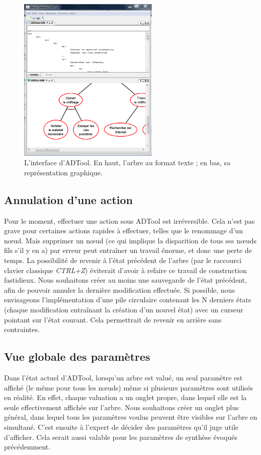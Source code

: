 		\begin{figure}[h]
			\centering
			\includegraphics[width=0.6\textwidth]{figure/interface_adtool.png}
			\caption{L'interface d'ADTool. En haut, l'arbre au format texte ; en bas, sa représentation graphique.}
			\label{fig:int_adTool}
		\end{figure}
	
	\subsection{Annulation d'une action}	
		Pour le moment, effectuer une action sous ADTool est irréversible. Cela n'est pas grave pour certaines actions rapides à effectuer, telles que le renommage d'un nœud. Mais supprimer un nœud (ce qui implique la disparition de tous ses nœuds fils s'il y en a) par erreur peut entraîner un travail énorme, et donc une perte de temps. La possibilité de revenir à l'état précédent de l'arbre (par le raccourci clavier classique \emph{CTRL+Z}) éviterait d'avoir à refaire ce travail de construction fastidieux. Nous souhaitons créer au moins une sauvegarde de l'état précédent, afin de pouvoir annuler la dernière modification effectuée. Si possible, nous envisageons l'implémentation d'une pile circulaire contenant les N derniers états (chaque modification entraînant la création d'un nouvel état) avec un curseur pointant sur l'état courant. Cela permettrait de revenir en arrière sans contraintes. %

	\subsection{Vue globale des paramètres}
		Dans l'état actuel d'ADTool, lorsqu'un arbre est valué, un seul paramètre est affiché (le même pour tous les nœuds) même si plusieurs paramètres sont utilisés en réalité. En effet, chaque valuation a un onglet propre, dans lequel elle est la seule effectivement affichée sur l'arbre. Nous souhaitons créer un onglet plus général, dans lequel tous les paramètres voulus peuvent être visibles sur l'arbre en simultané. C'est ensuite à l'expert de décider des paramètres qu'il juge utile d'afficher. Cela serait aussi valable pour les paramètres de synthèse évoqués précédemment.
	
